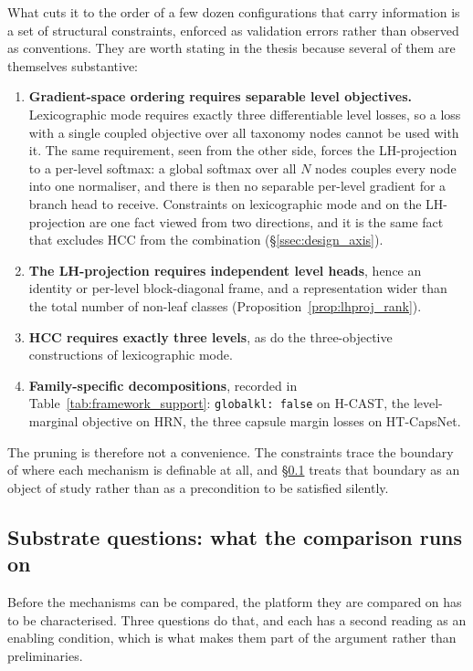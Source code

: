 What cuts it to the order of a few dozen configurations that carry information is
a set of structural constraints, enforced as validation errors rather than
observed as conventions. They are worth stating in the thesis because several of
them are themselves substantive:

\begin{enumerate}
    \item \textbf{Gradient-space ordering requires separable level objectives.}
    Lexicographic mode requires exactly three differentiable level losses, so a
    loss with a single coupled objective over all taxonomy nodes cannot be used
    with it. The same requirement, seen from the other side, forces the
    LH-projection to a per-level softmax: a global softmax over all $N$ nodes
    couples every node into one normaliser, and there is then no separable
    per-level gradient for a branch head to receive. Constraints on lexicographic
    mode and on the LH-projection are one fact viewed from two directions, and it
    is the same fact that excludes HCC from the combination
    (\S\ref{ssec:design_axis}).
    \item \textbf{The LH-projection requires independent level heads}, hence an
    identity or per-level block-diagonal frame, and a representation wider than
    the total number of non-leaf classes (Proposition~\ref{prop:lhproj_rank}).
    \item \textbf{HCC requires exactly three levels}, as do the three-objective
    constructions of lexicographic mode.
    \item \textbf{Family-specific decompositions}, recorded in
    Table~\ref{tab:framework_support}: \texttt{globalkl:\ false} on H-CAST, the
    level-marginal objective on HRN, the three capsule margin losses on
    HT-CapsNet.
\end{enumerate}

The pruning is therefore not a convenience. The constraints trace the boundary of
where each mechanism is definable at all, and \S\ref{ssec:design_substrate}
treats that boundary as an object of study rather than as a precondition to be
satisfied silently.

\subsection{Substrate questions: what the comparison runs on}
\label{ssec:design_substrate}

Before the mechanisms can be compared, the platform they are compared on has to be
characterised. Three questions do that, and each has a second reading as an
enabling condition, which is what makes them part of the argument rather than
preliminaries.

